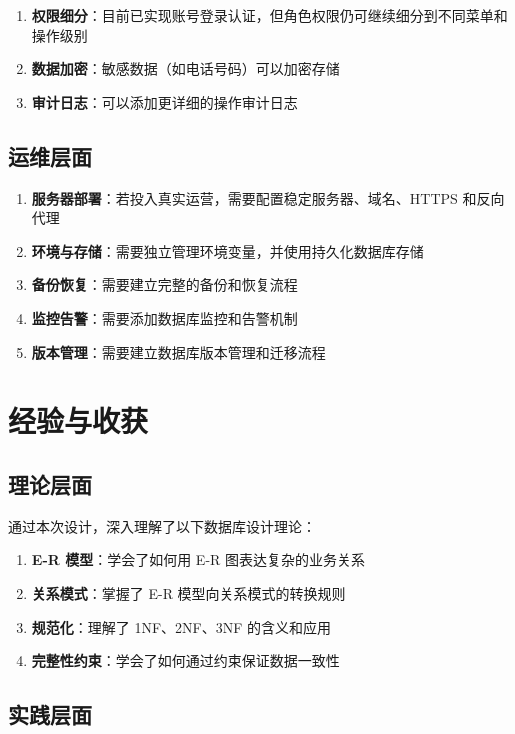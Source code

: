 \begin{enumerate}
  \item \textbf{权限细分}：目前已实现账号登录认证，但角色权限仍可继续细分到不同菜单和操作级别
  \item \textbf{数据加密}：敏感数据（如电话号码）可以加密存储
  \item \textbf{审计日志}：可以添加更详细的操作审计日志
\end{enumerate}

\subsection{运维层面}

\begin{enumerate}
  \item \textbf{服务器部署}：若投入真实运营，需要配置稳定服务器、域名、HTTPS 和反向代理
  \item \textbf{环境与存储}：需要独立管理环境变量，并使用持久化数据库存储
  \item \textbf{备份恢复}：需要建立完整的备份和恢复流程
  \item \textbf{监控告警}：需要添加数据库监控和告警机制
  \item \textbf{版本管理}：需要建立数据库版本管理和迁移流程
\end{enumerate}

\section{经验与收获}

\subsection{理论层面}

通过本次设计，深入理解了以下数据库设计理论：

\begin{enumerate}
  \item \textbf{E-R 模型}：学会了如何用 E-R 图表达复杂的业务关系
  \item \textbf{关系模式}：掌握了 E-R 模型向关系模式的转换规则
  \item \textbf{规范化}：理解了 1NF、2NF、3NF 的含义和应用
  \item \textbf{完整性约束}：学会了如何通过约束保证数据一致性
\end{enumerate}

\subsection{实践层面}

